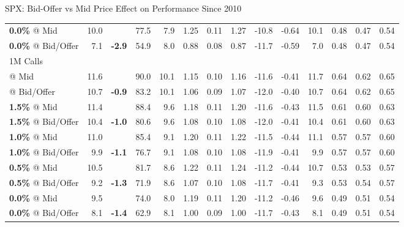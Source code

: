 \documentclass{beamer}
\begin{document}
\begin{frame}{\normalsize SPX: Bid-Offer vs Mid Price Effect on Performance Since 2010}
{\begin{tabular}{lrcrrrrrrrrrrr}
\addlinespace
{\bf 0.0\%} @ Mid & 10.0 & & 77.5 & 7.9 & 1.25 & 0.11 & 1.27 & -10.8 & -0.64 & 10.1 & 0.48 & 0.47 & 0.54\\
{\bf 0.0\%} @ Bid/Offer & 7.1 & {\bf \color{red} -2.9} & 54.9 & 8.0 & 0.88 & 0.08 & 0.87 & -11.7 & -0.59 & 7.0 & 0.48 & 0.47 & 0.54\\
\bottomrule
\addlinespace
1M Calls\\
\midrule
\color{blue}{\bf 2.0\%} @ Mid & 11.6 & & 90.0 & 10.1 & 1.15 & 0.10 & 1.16 & -11.6 & -0.41 & 11.7 & 0.64 & 0.62 & 0.65\\
\color{blue}{\bf 2.0\%} @ Bid/Offer & 10.7 & {\bf \color{red} -0.9} & 83.2 & 10.1 & 1.06 & 0.09 & 1.07 & -12.0 & -0.40 & 10.7 & 0.64 & 0.62 & 0.65\\
\addlinespace
{\bf 1.5\%} @ Mid & 11.4 & & 88.4 & 9.6 & 1.18 & 0.11 & 1.20 & -11.6 & -0.43 & 11.5 & 0.61 & 0.60 & 0.63\\
{\bf 1.5\%} @ Bid/Offer & 10.4 & {\bf \color{red} -1.0} & 80.6 & 9.6 & 1.08 & 0.10 & 1.08 & -12.0 & -0.41 & 10.4 & 0.61 & 0.60 & 0.63\\
\addlinespace
{\bf 1.0\%} @ Mid & 11.0 & & 85.4 & 9.1 & 1.20 & 0.11 & 1.22 & -11.5 & -0.44 & 11.1 & 0.57 & 0.57 & 0.60\\
{\bf 1.0\%} @ Bid/Offer & 9.9 & {\bf \color{red} -1.1} & 76.7 & 9.1 & 1.08 & 0.10 & 1.08 & -11.9 & -0.41 & 9.9 & 0.57 & 0.57 & 0.60\\
\addlinespace
{\bf 0.5\%} @ Mid & 10.5 & & 81.7 & 8.6 & 1.22 & 0.11 & 1.24 & -11.2 & -0.44 & 10.7 & 0.53 & 0.53 & 0.57\\
{\bf 0.5\%} @ Bid/Offer & 9.2 & {\bf \color{red} -1.3} & 71.9 & 8.6 & 1.07 & 0.10 & 1.08 & -11.7 & -0.41 & 9.3 & 0.53 & 0.54 & 0.57\\
\addlinespace
{\bf 0.0\%} @ Mid & 9.5 & & 74.0 & 8.0 & 1.19 & 0.11 & 1.20 & -11.2 & -0.46 & 9.6 & 0.49 & 0.51 & 0.54\\
{\bf 0.0\%} @ Bid/Offer & 8.1 & {\bf \color{red} -1.4} & 62.9 & 8.1 & 1.00 & 0.09 & 1.00 & -11.7 & -0.43 & 8.1 & 0.49 & 0.51 & 0.54\\
\bottomrule
\end{tabular}
}

\end{frame}
\end{document}

